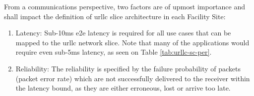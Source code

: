     From a communications perspective, two factors are of upmost importance and shall impact the definition of \acrshort{urllc} slice architecture in each Facility Site:
    
    \begin{enumerate}
        \item Latency: Sub-10ms \acrshort{e2e} latency is required for all use cases that can be mapped to the \acrshort{urllc} network slice. Note that many of the applications would require even sub-5ms latency, as seen on Table \ref{tab:urllc-sc-per}. 
        \item Reliability: The reliability is specified by the failure probability of packets (packet error rate) which are not successfully delivered to the receiver within the latency bound, as they are either erroneous, lost or arrive too late.
    \end{enumerate}
        
